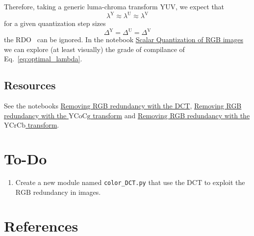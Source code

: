Therefore, taking a generic luma-chroma transform $\text{YUV}$, we
expect that
\begin{equation}
  \lambda^{\text{Y}} \approx \lambda^{\text{U}} \approx \lambda^{\text{V}}
  \label{eq:optimal_lambda}
\end{equation}
for a given quantization step sizes
\begin{equation}
  \Delta^{\text{Y}} = \Delta^{\text{U}} = \Delta^{\text{V}}
  \label{eq:optimal_lambda}
\end{equation}
the RDO~\cite{vruiz__information_theory} can be ignored. In the
notebook
\href{https://github.com/Sistemas-Multimedia/Sistemas-Multimedia.github.io/blob/master/contents/RGB_SQ/RGB_SQ.ipynb}{Scalar
  Quantization of RGB images} we can explore (at least visually) the
grade of compilance of Eq.~\eqref{eq:optimal_lambda}.

\subsection*{Resources}
See the notebooks
\href{https://github.com/vicente-gonzalez-ruiz/color_transforms/blob/main/docs/3DCT/3DCT_over_RGB.ipynb}{Removing
  RGB redundancy with the DCT},
\href{https://github.com/vicente-gonzalez-ruiz/color_transforms/blob/main/docs/YCoCg/YCoCg_over_RGB.ipynb}{Removing
  RGB redundancy with the $\text{YCoCg}$ transform} and
\href{https://github.com/vicente-gonzalez-ruiz/color_transforms/blob/main/docs/YCrCb/YCrCb_over_RGB.ipynb}{Removing
  RGB redundancy with the $\text{YCrCb}$ transform}.

\section*{To-Do}
\begin{enumerate}
\item Create a new module named \texttt{color\_DCT.py} that use the
  $\text{DCT}$ to exploit the $\text{RGB}$ redundancy in images.
\end{enumerate}

\section{References}

\renewcommand{\addcontentsline}[3]{}%


